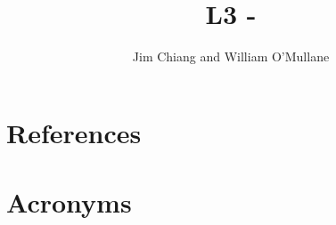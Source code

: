 \documentclass[OPS,authoryear,toc]{lsstdoc}
\title{L3 - \milestone}
\author{%
Jim Chiang and William O'Mullane
}
\date{\vcsDate}
\begin{document}
\maketitle



\appendix





\section{References} \label{sec:bib}
\renewcommand{\refname}{} %


\section{Acronyms} \label{sec:acronyms}

\end{document}
